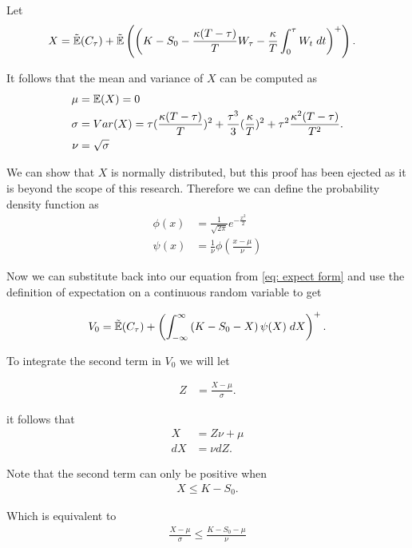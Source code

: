 \documentclass[reqno]{amsart}
\begin{document}
Let 
\begin{align}
     X &= \tilde{\mathbb{E}}(C_\tau) + \tilde{\mathbb{E}}\left(\left(K- S_0 - \frac{\kappa(T-\tau)}{T} W_\tau - \frac{\kappa}{T} \int_0^\tau W_t \; dt  \right)^+\right).
\end{align}

It follows that the mean and variance of $X$ can be computed as 
\begin{align}
     \mu &= \mathbb{E}(X) = 0\\
     \sigma &= Var(X) = \tau(\frac{\kappa(T-\tau)}{T})^2 + \frac{\tau^3}{3}(\frac{\kappa}{T})^2 + \tau^2\frac{\kappa^2(T-\tau)}{T^2}.\\
     \nu &= \sqrt{\sigma}\\
\end{align}

We can show that $X$ is normally distributed, but this proof has been ejected as it is beyond the scope of this research. Therefore we can define the probability density function as
\begin{align}
     \phi(x) &=\frac{1}{\sqrt{2\pi}}e^{-\frac{x^2}{2}}\\
     \psi(x) &= \frac{1}{\nu}\phi(\frac{x-\mu}{\nu})
\end{align}

Now we can substitute back into our equation from \eqref{eq: expect form} and use the definition of expectation on a continuous random variable to get 

\begin{align} \label{eq: prechange}
     V_0 = \tilde{\mathbb{E}}(C_\tau) + \left(\int_{-\infty}^{\infty}\left(K- S_0 - X\right)\psi(X) \; dX\right)^+.
\end{align}

To integrate the second term in $V_0$ we will let

\begin{align}
     Z &= \frac{X-\mu}{\sigma}.
\end{align}

it follows that 
\begin{align}\label{eq: change variable}
     X &= Z\nu + \mu\\
     dX &= \nu dZ.
\end{align}

Note that the second term can only be positive when 
\begin{align}
     X \leq K - S_0.
\end{align}

Which is equivalent to 
\begin{align} \label{eq: bound}
     \frac{X-\mu}{\sigma} \leq \frac{K-S_0-\mu}{\nu}
\end{align}
\end{document}
